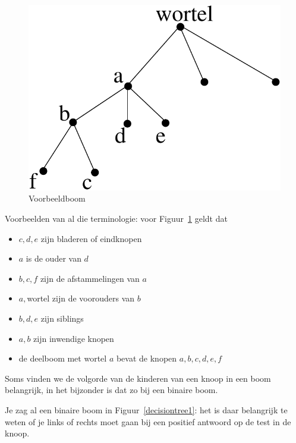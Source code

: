 \begin{figure}[ht]
\begin{center}
\includegraphics[width=0.25\linewidth,keepaspectratio]{boom1}
\end{center}
\caption{Voorbeeldboom \label{boom1}}
\end{figure}


Voorbeelden van al die terminologie: voor Figuur~\ref{boom1} geldt dat
\begin{itemize}
\item
$c,d,e$ zijn bladeren of eindknopen
\item
$a$ is de ouder van $d$
\item
$b,c,f$ zijn de afstammelingen van $a$
\item
$a,$wortel zijn de voorouders van $b$
\item
$b,d,e$ zijn siblings
\item
$a,b$ zijn inwendige knopen
\item
de deelboom met wortel $a$ bevat de knopen $a,b,c,d,e,f$
\end{itemize}

Soms vinden we de volgorde van de kinderen van een knoop in een boom
belangrijk, in het bijzonder is dat zo bij een binaire boom.


Je zag al een binaire boom in Figuur~\ref{decisiontree1}: het is daar
belangrijk te weten of je links of rechts moet gaan bij een positief
antwoord op de test in de knoop.



